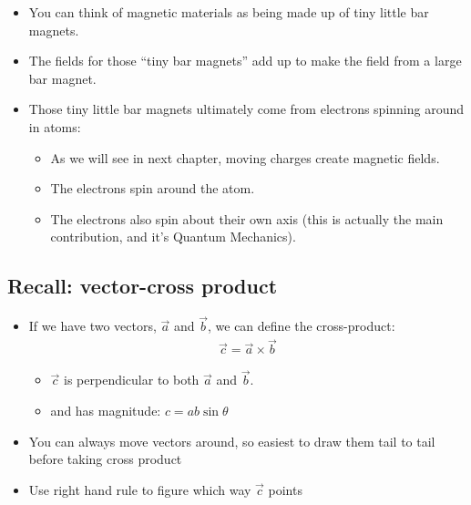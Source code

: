 \documentclass[aspectratio=169,
hyperref={colorlinks,urlcolor=blue}
]{beamer}
\begin{document}
{
\begin{itemize}
\item You can think of magnetic materials as being made up of tiny little bar magnets.
\item The fields for those ``tiny bar magnets'' add up to make the field from a large bar magnet.
\item Those tiny little bar magnets ultimately come from electrons spinning around in atoms:
\begin{itemize}
\item As we will see in next chapter, moving charges create magnetic fields.
\item The electrons spin around the atom.
\item The electrons also spin about their own axis (this is actually the main contribution, and it's Quantum Mechanics).
\end{itemize}
\end{itemize}
}
{
\vspace{-1.2cm}
\vspace{-0.5cm}
}



\subsection{Recall: vector-cross product}
{
\begin{itemize}
\item If we have two vectors, $\vec a$ and $\vec b$, we can define the cross-product:
\begin{align*}%
\vec c = \vec a \times \vec b
\end{align*}%
\begin{itemize}
\item $\vec c$ is perpendicular to both $\vec a$ and $\vec b$.
\item  and has magnitude: $c=ab\sin\theta$
\end{itemize}
\item You can always move vectors around, so easiest to draw them tail to tail before taking cross product
\item Use right hand rule to figure which way $\vec c$ points
\end{itemize}
}
{
\centering
{}%
%
}
\end{document}
